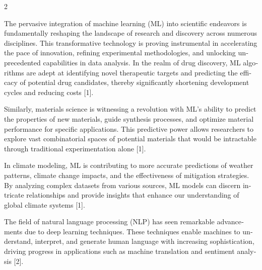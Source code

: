 \documentclass[twoside]{article}
\newcommand{\timesfont}{\rmfamily}
\begin{document}
\vspace{4pt}

\setlength{\columnsep}{14pt}
\begin{multicols}{2}
\setlength{\parindent}{0pt}
\fontsize{10pt}{12pt}\selectfont\color{color_29791}

\par\vspace{4pt}

\timesfont
\setlength{\parindent}{0pt} %
\begin{otherlanguage}{english}
The pervasive integration of machine learning (ML) into scientific endeavors is fundamentally reshaping the landscape of research and discovery across numerous disciplines. This transformative technology is proving instrumental in accelerating the pace of innovation, refining experimental methodologies, and unlocking unprecedented capabilities in data analysis. In the realm of drug discovery, ML algorithms are adept at identifying novel therapeutic targets and predicting the efficacy of potential drug candidates, thereby significantly shortening development cycles and reducing costs [1].

Similarly, materials science is witnessing a revolution with ML's ability to predict the properties of new materials, guide synthesis processes, and optimize material performance for specific applications. This predictive power allows researchers to explore vast combinatorial spaces of potential materials that would be intractable through traditional experimentation alone [1].

In climate modeling, ML is contributing to more accurate predictions of weather patterns, climate change impacts, and the effectiveness of mitigation strategies. By analyzing complex datasets from various sources, ML models can discern intricate relationships and provide insights that enhance our understanding of global climate systems [1].

The field of natural language processing (NLP) has seen remarkable advancements due to deep learning techniques. These techniques enable machines to understand, interpret, and generate human language with increasing sophistication, driving progress in applications such as machine translation and sentiment analysis [2].


\end{otherlanguage}
\end{multicols}
\end{document}
